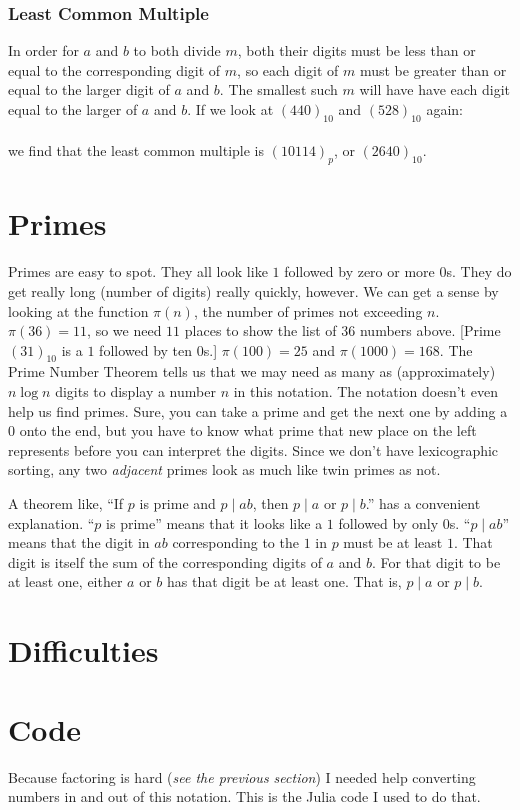 \documentclass[12pt]{article}
\newcommand{\ppn}[1]{(#1)_p}
\begin{document}
\subsubsection*{Least Common Multiple}
In order for $a$ and $b$ to both divide $m$, both their digits must be less than or equal to the corresponding digit of $m$, so each digit of $m$ must be greater than or equal to the larger digit of $a$ and $b$. The smallest such $m$ will have have each digit equal to the larger of $a$ and $b$. If we look at $(440)_{10}$ and $(528)_{10}$ again:\\
\ttfamily \small
{}
\normalfont \normalsize \\
we find that the least common multiple is $\ppn{10114}$, or $(2640)_{10}$.

\section*{Primes}

Primes are easy to spot. They all look like $1$ followed by zero or more $0$s. They do get really long (number of digits) really quickly, however. We can get a sense by looking at the function $\pi(n)$, the number of primes not exceeding $n$. $\pi(36) = 11$, so we need $11$ places to show the list of $36$ numbers above. [Prime $(31)_{10}$ is a $1$ followed by ten $0$s.] $\pi(100) = 25$ and $\pi(1000) = 168$. The Prime Number Theorem tells us that we may need as many as (approximately) $n \log n$ digits to display a number $n$ in this notation. The notation doesn't even help us find primes. Sure, you can take a prime and get the next one by adding a $0$ onto the end, but you have to know what prime that new place on the left represents before you can interpret the digits. Since we don't have lexicographic sorting, any two \textit{adjacent} primes look as much like twin primes as not.

A theorem like, “If $p$ is prime and $p \mid ab$, then $p \mid a$ or $p \mid b$.” has a convenient explanation. “$p$ is prime” means that it looks like a $1$ followed by only $0$s. “$p \mid ab$” means that the digit in $ab$ corresponding to the $1$ in $p$ must be at least $1$. That digit is itself the sum of the corresponding digits of $a$ and $b$. For that digit to be at least one, either $a$ or $b$ has that digit be at least one. That is, $p \mid a$ or $p \mid b$.

\section*{Difficulties}

\section*{Code}
Because factoring is hard (\textit{see the previous section}) I needed help converting numbers in and out of this notation. This is the Julia code I used to do that.
\end{document}
